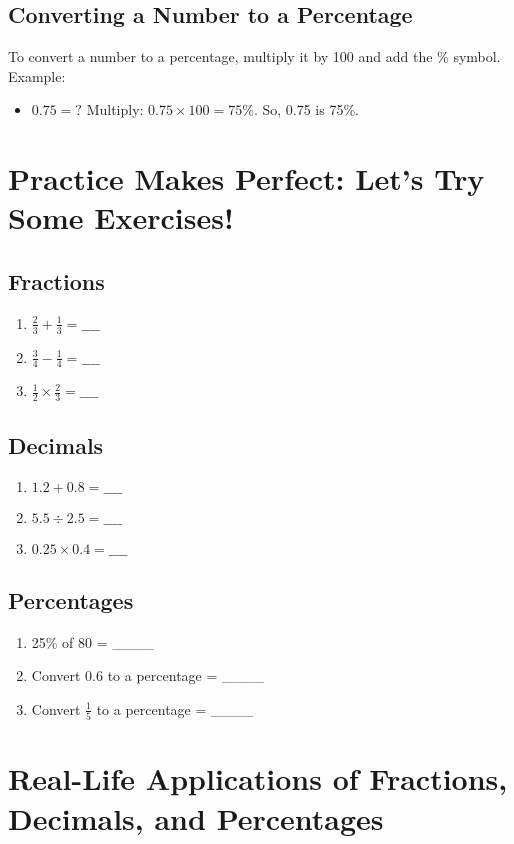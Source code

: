 \subsection{Converting a Number to a Percentage}
To convert a number to a percentage, multiply it by 100 and add the \% symbol. Example:
\begin{itemize}
    \item $0.75 = ?$ Multiply: $0.75 \times 100 = 75\%$. So, 0.75 is 75\%.
\end{itemize}

\section{Practice Makes Perfect: Let’s Try Some Exercises!}
\subsection{Fractions}
\begin{enumerate}
    \item $\frac{2}{3} + \frac{1}{3} = \_\_\_\_$
    \item $\frac{3}{4} - \frac{1}{4} = \_\_\_\_$
    \item $\frac{1}{2} \times \frac{2}{3} = \_\_\_\_$
\end{enumerate}

\subsection{Decimals}
\begin{enumerate}
    \item $1.2 + 0.8 = \_\_\_\_$
    \item $5.5 \div 2.5 = \_\_\_\_$
    \item $0.25 \times 0.4 = \_\_\_\_$
\end{enumerate}

\subsection{Percentages}
\begin{enumerate}
    \item 25\% of 80 = \_\_\_\_
    \item Convert 0.6 to a percentage = \_\_\_\_
    \item Convert $\frac{1}{5}$ to a percentage = \_\_\_\_
\end{enumerate}

\section{Real-Life Applications of Fractions, Decimals, and Percentages}
